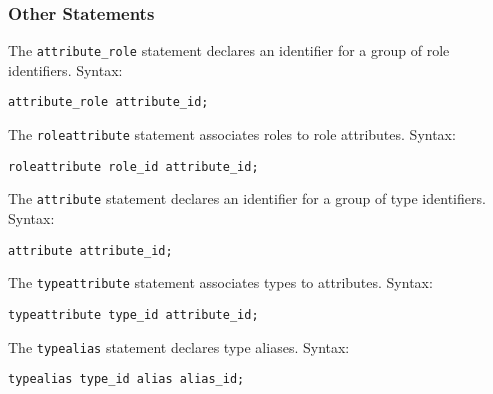 \subsubsection{Other Statements}
The \texttt{attribute\_role} statement declares an identifier for a group of
role identifiers. Syntax:
\begin{lstlisting}[language=te]
attribute_role attribute_id;
\end{lstlisting}
The \texttt{roleattribute} statement associates roles to role attributes.
Syntax:
\begin{lstlisting}[language=te]
roleattribute role_id attribute_id;
\end{lstlisting}
The \texttt{attribute} statement declares an identifier for a group of type
identifiers. Syntax:
\begin{lstlisting}[language=te]
attribute attribute_id;
\end{lstlisting}
The \texttt{typeattribute} statement associates types to attributes. Syntax:
\begin{lstlisting}[language=te]
typeattribute type_id attribute_id;
\end{lstlisting}
The \texttt{typealias} statement declares type aliases. Syntax:
\begin{lstlisting}[language=te]
typealias type_id alias alias_id;
\end{lstlisting}

